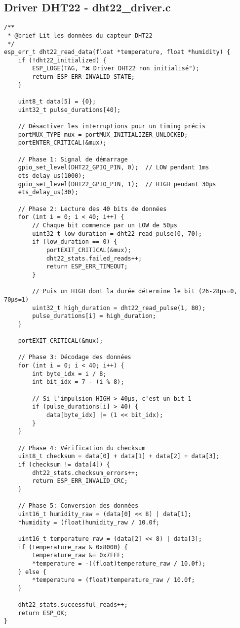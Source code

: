 \subsection{Driver DHT22 - dht22\_driver.c}

\begin{lstlisting}[caption={Driver complet du capteur DHT22}]
/**
 * @brief Lit les données du capteur DHT22
 */
esp_err_t dht22_read_data(float *temperature, float *humidity) {
    if (!dht22_initialized) {
        ESP_LOGE(TAG, "❌ Driver DHT22 non initialisé");
        return ESP_ERR_INVALID_STATE;
    }
    
    uint8_t data[5] = {0};
    uint32_t pulse_durations[40];
    
    // Désactiver les interruptions pour un timing précis
    portMUX_TYPE mux = portMUX_INITIALIZER_UNLOCKED;
    portENTER_CRITICAL(&mux);
    
    // Phase 1: Signal de démarrage
    gpio_set_level(DHT22_GPIO_PIN, 0);  // LOW pendant 1ms
    ets_delay_us(1000);
    gpio_set_level(DHT22_GPIO_PIN, 1);  // HIGH pendant 30µs
    ets_delay_us(30);
    
    // Phase 2: Lecture des 40 bits de données
    for (int i = 0; i < 40; i++) {
        // Chaque bit commence par un LOW de 50µs
        uint32_t low_duration = dht22_read_pulse(0, 70);
        if (low_duration == 0) {
            portEXIT_CRITICAL(&mux);
            dht22_stats.failed_reads++;
            return ESP_ERR_TIMEOUT;
        }
        
        // Puis un HIGH dont la durée détermine le bit (26-28µs=0, 70µs=1)
        uint32_t high_duration = dht22_read_pulse(1, 80);
        pulse_durations[i] = high_duration;
    }
    
    portEXIT_CRITICAL(&mux);
    
    // Phase 3: Décodage des données
    for (int i = 0; i < 40; i++) {
        int byte_idx = i / 8;
        int bit_idx = 7 - (i % 8);
        
        // Si l'impulsion HIGH > 40µs, c'est un bit 1
        if (pulse_durations[i] > 40) {
            data[byte_idx] |= (1 << bit_idx);
        }
    }
    
    // Phase 4: Vérification du checksum
    uint8_t checksum = data[0] + data[1] + data[2] + data[3];
    if (checksum != data[4]) {
        dht22_stats.checksum_errors++;
        return ESP_ERR_INVALID_CRC;
    }
    
    // Phase 5: Conversion des données
    uint16_t humidity_raw = (data[0] << 8) | data[1];
    *humidity = (float)humidity_raw / 10.0f;
    
    uint16_t temperature_raw = (data[2] << 8) | data[3];
    if (temperature_raw & 0x8000) {
        temperature_raw &= 0x7FFF;
        *temperature = -((float)temperature_raw / 10.0f);
    } else {
        *temperature = (float)temperature_raw / 10.0f;
    }
    
    dht22_stats.successful_reads++;
    return ESP_OK;
}
\end{lstlisting}


